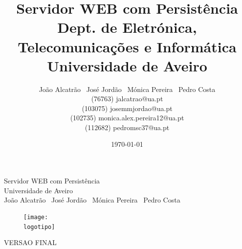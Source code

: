 \documentclass{report}
\begin{document}
%
\def\titulo{Servidor WEB com Persistência}
\def\data{DATA}
\def\autores{João Alcatrão \
José Jordão \ Mónica Pereira \ Pedro Costa}
\def\autorescontactos{(76763) jalcatrao@ua.pt \\
(103075) josemmjordao@ua.pt \\ 
(102735) monica.alex.pereira12@ua.pt \\
(112682) pedromsc37@ua.pt}
\def\versao{VERSAO FINAL}
\def\departamento{Dept. de Eletrónica, Telecomunicações e Informática}
\def\empresa{Universidade de Aveiro}
\def\logotipo{ua.pdf}
%
%
\begin{titlepage}

\begin{center}
%
\vspace*{50mm}
%
{\Huge \titulo}\\ 
%
\vspace{10mm}
%
{\Large \empresa}\\
%
\vspace{10mm}
%
{\LARGE \autores}\\ 
%
\vspace{30mm}
%
\begin{figure}[h]
\center
\texttt{[image: \\logotipo]}
\end{figure}
%
\vspace{30mm}
\end{center}
%
\begin{flushright}
\versao
\end{flushright}
\end{titlepage}

\title{%
{\Huge\textbf{\titulo}}\\
{\Large \departamento\\ \empresa}
}
%
\author{%
    \autores \\
    \autorescontactos
}
%
\date{\today}
%
\maketitle

\end{document}
